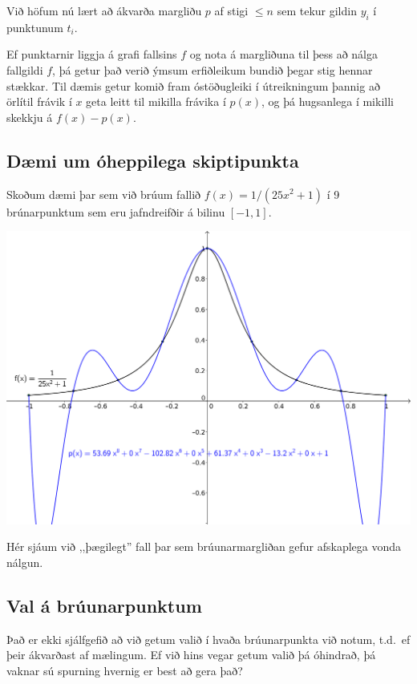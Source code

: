 \documentclass[A4paper,10pt,icelandic]{sphinxmanual}
\begin{document}
Við höfum nú lært að ákvarða margliðu \(p\) af stigi \(\leq n\)
sem tekur gildin \(y_i\) í punktunum \(t_i\).

Ef punktarnir liggja á grafi fallsins \(f\) og nota á margliðuna til
þess að nálga fallgildi \(f\), þá getur það verið ýmsum erfiðleikum
bundið þegar stig hennar stækkar. Til dæmis getur komið fram
óstöðugleiki í útreikningum þannig að örlítil frávik í \(x\) geta
leitt til mikilla frávika í \(p(x)\), og þá hugsanlega í mikilli
skekkju á \(f(x)-p(x)\).


\subsection{Dæmi um óheppilega skiptipunkta}
\label{kafli03:daemi-um-oheppilega-skiptipunkta}
Skoðum dæmi þar sem við brúum fallið \(f(x) = 1/(25x^2+1)\) í 9
brúnarpunktum sem eru jafndreifðir á bilinu \([-1,1]\).

\includegraphics{vond_bruun1.png}

Hér sjáum við ,,þægilegt'' fall þar sem brúunarmargliðan gefur afskaplega
vonda nálgun.


\subsection{Val á brúunarpunktum}
\label{kafli03:val-a-bruunarpunktum}
Það er ekki sjálfgefið að við getum valið í hvaða brúunarpunkta við
notum, t.d. ef þeir ákvarðast af mælingum. Ef við hins vegar getum valið
þá óhindrað, þá vaknar sú spurning hvernig er best að gera það?

\end{document}
